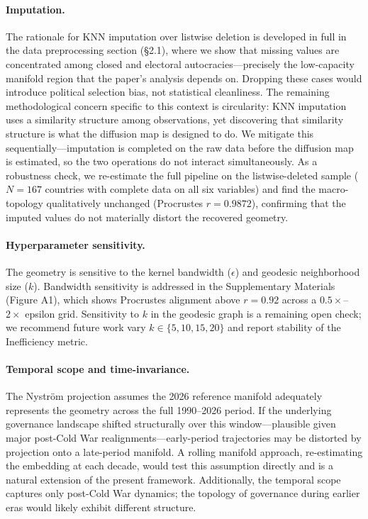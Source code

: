 \documentclass[12pt]{article}
\begin{document}
\paragraph{Imputation.}\label{sec:limitations} The rationale for KNN imputation over listwise deletion is developed in full in the data preprocessing section (§2.1), where we show that missing values are concentrated among closed and electoral autocracies---precisely the low-capacity manifold region that the paper's analysis depends on. Dropping these cases would introduce political selection bias, not statistical cleanliness. The remaining methodological concern specific to this context is circularity: KNN imputation uses a similarity structure among observations, yet discovering that similarity structure is what the diffusion map is designed to do. We mitigate this sequentially---imputation is completed on the raw data before the diffusion map is estimated, so the two operations do not interact simultaneously. As a robustness check, we re-estimate the full pipeline on the listwise-deleted sample ($N = 167$ countries with complete data on all six variables) and find the macro-topology qualitatively unchanged (Procrustes $r = 0.9872$), confirming that the imputed values do not materially distort the recovered geometry.

\paragraph{Hyperparameter sensitivity.} The geometry is sensitive to the kernel bandwidth ($\epsilon$) and geodesic neighborhood size ($k$). Bandwidth sensitivity is addressed in the Supplementary Materials (Figure A1), which shows Procrustes alignment above $r = 0.92$ across a $0.5\times$--$2\times$ epsilon grid. Sensitivity to $k$ in the geodesic graph is a remaining open check; we recommend future work vary $k \in \{5, 10, 15, 20\}$ and report stability of the Inefficiency metric.

\paragraph{Temporal scope and time-invariance.} The Nyström projection assumes the 2026 reference manifold adequately represents the geometry across the full 1990--2026 period. If the underlying governance landscape shifted structurally over this window—plausible given major post-Cold War realignments—early-period trajectories may be distorted by projection onto a late-period manifold. A rolling manifold approach, re-estimating the embedding at each decade, would test this assumption directly and is a natural extension of the present framework. Additionally, the temporal scope captures only post-Cold War dynamics; the topology of governance during earlier eras would likely exhibit different structure.
\end{document}
